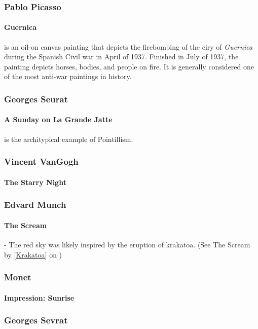 			\subsubsection{Pablo Picasso}
				\paragraph{Guernica} is an oil-on canvas painting that depicts the firebombing of the ciry of \textit{Guernica} during the Spanish Civil war in April of 1937.  Finished in July of 1937, the painting depicts horses, bodies, and people on fire.  It is generally considered one of the most anti-war paintings in history.
				
			\subsubsection{Georges Seurat}
				\paragraph{A Sunday on La Grande Jatte} is the architypical example of Pointillism. 
				
			
			\subsubsection{Vincent VanGogh}
				\paragraph{The Starry Night}
			\subsubsection{Edvard Munch} \label{EdwardMunchArt}
				\paragraph{The Scream} - The red sky was likely inspired by the eruption of krakatoa. (See The Scream by \ref{Krakatoa} on )
				
			\subsubsection{Monet}
				\paragraph{Impression: Sunrise}
			\subsubsection{Georges Sevrat}
